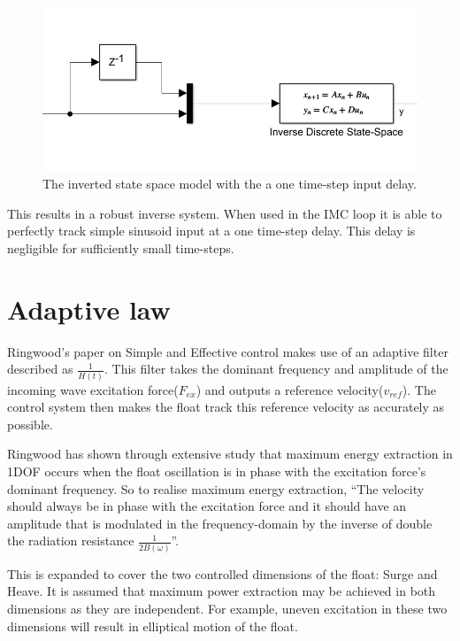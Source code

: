 \documentclass{report}
\begin{document}
\begin{figure}
\centering
\includegraphics[scale=0.5]{graphics/inverseSS}
\caption{The inverted state space model with the a one time-step input delay.}
\label{fig:inverseSS}
\end{figure}

This results in a robust inverse system. When used in the IMC loop it is able to perfectly track simple sinusoid input at a one time-step delay. This delay is negligible for sufficiently small time-steps.

\section{Adaptive law}
\label{adaptiveLawSection}
Ringwood's paper\cite{ringwood} on Simple and Effective control makes use of an adaptive filter described as 
$\frac{1}{H(t)}$.  This filter takes the dominant frequency and amplitude of the incoming wave excitation force($F_{ex}$) and outputs a reference velocity($v_{ref}$). The control system then makes the float track this reference velocity as accurately as possible.

Ringwood has shown through extensive study that maximum energy extraction in 1DOF occurs when the float oscillation is in phase with the excitation force's dominant frequency\cite{ringwood}. So to realise maximum energy extraction, ``The velocity should always be in phase with the excitation force and it should have an amplitude that is modulated in the frequency-domain by the inverse of double the radiation resistance $\frac{1}{2B(\omega)}$''\cite{ringwood}.

This is expanded to cover the two controlled dimensions of the float: Surge and Heave. It is assumed that maximum power extraction may be achieved in both dimensions as they are independent. For example, uneven excitation in these two dimensions will result in elliptical motion of the float.
\end{document}

